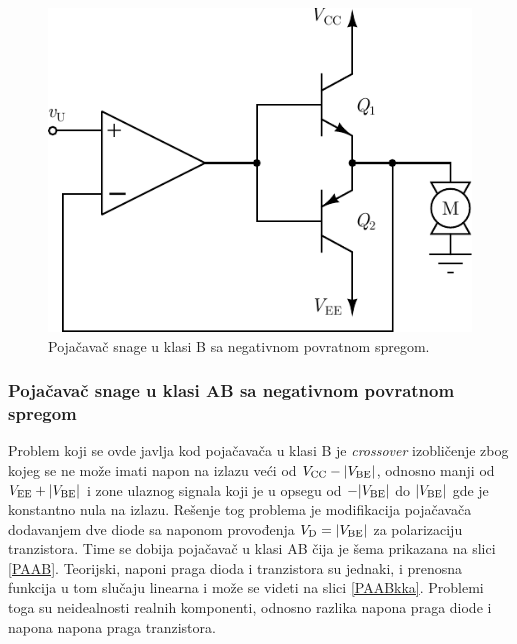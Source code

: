 \documentclass[a4paper, 12pt, diplomski]{etf}
\begin{document}
\begin{figure}[h!]
    \centering
    \includegraphics[scale=1]{fig/PABnps.pdf}
    \caption{Pojačavač snage u klasi B sa negativnom povratnom spregom.}
    \label{PAbNPS}
\end{figure}


\subsubsection{Pojačavač snage u klasi AB sa negativnom povratnom spregom} \label{s:PAAB}

Problem koji se ovde javlja kod pojačavača u klasi B je \textit{crossover} izobličenje zbog kojeg se ne može imati napon na izlazu veći od $V_{\rm{CC}} - |V_{\rm B \rm E}|$, odnosno manji od $V_{\rm{EE}} + |V_{\rm B \rm E}|$ i zone ulaznog signala koji je u opsegu od $-|V_{\rm B \rm E}|$ do $|V_{\rm B \rm E}|$ gde je konstantno nula na izlazu. Rešenje tog problema je modifikacija pojačavača dodavanjem dve diode sa naponom provođenja $V_{\rm D} = |V_{\rm B \rm E}|$ za polarizaciju tranzistora. Time se dobija pojačavač u klasi AB čija je šema prikazana na slici \ref{PAAB}. Teorijski, naponi praga dioda i tranzistora su jednaki, i prenosna funkcija u tom slučaju linearna i može se videti na slici \ref{PAABkka}. Problemi toga su neidealnosti realnih komponenti, odnosno razlika napona praga diode i napona napona praga tranzistora.
\end{document}

